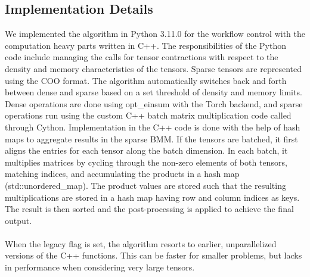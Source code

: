 \subsection{Implementation Details}
We implemented the algorithm in Python 3.11.0 for the workflow control with the computation heavy 
parts written in C++. The responsibilities of the Python code include managing the calls for 
tensor contractions with respect to the density and memory characteristics of the tensors. Sparse 
tensors are represented using the COO format. The algorithm automatically switches back and forth 
between dense and sparse based on a set threshold of density and memory limits. Dense operations 
are done using opt\_einsum with the Torch backend, and sparse operations run using the custom 
C++ batch matrix multiplication code called through Cython. Implementation in the C++ code is 
done with the help of hash maps to aggregate results in the sparse BMM. If the tensors are batched, 
it first aligns the entries for each tensor along the batch dimension. In each batch, it multiplies 
matrices by cycling through the non-zero elements of both tensors, matching indices, and accumulating 
the products in a hash map (std::unordered\_map). The product values are stored such that the 
resulting multiplications are stored in a hash map having row and column indices as keys. The result 
is then sorted and the post-processing is applied to achieve the final output.
\\
\\
When the legacy flag is set, the algorithm resorts to earlier, unparallelized versions of the C++ 
functions. This can be faster for smaller problems, but lacks in performance when considering very large
tensors.